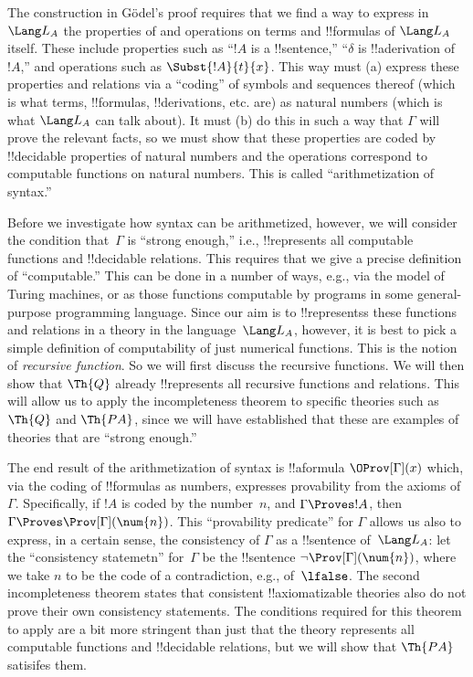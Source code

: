 \documentclass[../../../include/open-logic-section]{subfiles}
\begin{document}
The construction in G\"odel's proof requires that we find a way to
express in $\Lang L_A$ the properties of and operations on terms and
!!{formula}s of $\Lang L_A$ itself. These include properties such as
``$!A$ is a !!{sentence},'' ``$\delta$ is !!a{derivation} of~$!A$,''
and operations such as $\Subst{!A}{t}{x}$.  This way must (a) express
these properties and relations via a ``coding'' of symbols and
sequences thereof (which is what terms, !!{formula}s, !!{derivation}s,
etc. are) as natural numbers (which is what $\Lang L_A$ can talk
about). It must (b) do this in such a way that $\Gamma$ will prove the
relevant facts, so we must show that these properties are coded by
!!{decidable} properties of natural numbers and the operations
correspond to computable functions on natural numbers. This is called
``arithmetization of syntax.''

Before we investigate how syntax can be arithmetized, however, we will
consider the condition that~$\Gamma$ is ``strong enough,'' i.e.,
!!{represents} all computable functions and !!{decidable} relations.
This requires that we give a precise definition of ``computable.''
This can be done in a number of ways, e.g., via the model of Turing
machines, or as those functions computable by programs in some
general-purpose programming language.  Since our aim is to
!!{represents}s these functions and relations in a theory in the
language~$\Lang L_A$, however, it is best to pick a simple definition
of computability of just numerical functions.  This is the notion of
\emph{recursive function}.  So we will first discuss the recursive
functions. We will then show that $\Th{Q}$ already !!{represents} all
recursive functions and relations.  This will allow us to apply the
incompleteness theorem to specific theories such as $\Th{Q}$ and
$\Th{PA}$, since we will have established that these are examples of
theories that are ``strong enough.''

The end result of the arithmetization of syntax is
!!a{formula} $\OProv[\Gamma](x)$ which, via the coding of !!{formula}s
as numbers, expresses provability from the axioms of~$\Gamma$.
Specifically, if $!A$ is coded by the number~$n$, and $\Gamma \Proves
!A$, then $\Gamma \Proves \Prov[\Gamma](\num{n})$.  This ``provability
predicate'' for $\Gamma$ allows us also to express, in a certain
sense, the consistency of $\Gamma$ as a !!{sentence} of~$\Lang L_A$:
let the ``consistency statemetn'' for~$\Gamma$ be the !!{sentence}
$\lnot \Prov[\Gamma](\num{n})$, where we take $n$ to be the code of a
contradiction, e.g., of~$\lfalse$.  The second incompleteness theorem
states that consistent !!{axiomatizable} theories also do not prove
their own consistency statements.  The conditions required for this
theorem to apply are a bit more stringent than just that the theory
represents all computable functions and !!{decidable} relations, but
we will show that $\Th{PA}$ satisifes them.
\end{document}
